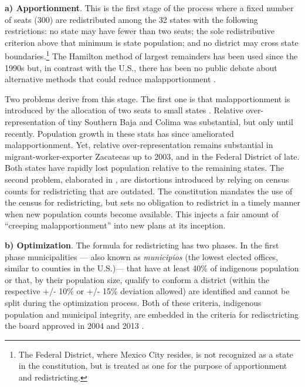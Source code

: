 \documentclass[letter,12pt]{article}
\begin{document}
\textbf{a) Apportionment}. This is the first stage of the process where a fixed number of seats (300) are redistributed among the 32 states with the following restrictions: no state may have fewer than two seats; the sole redistributive criterion above that minimum is state population; and no district may cross state boundaries.\footnote{The Federal District, where Mexico City resides, is not recognized as a state in the constitution, but is treated as one for the purpose of apportionment and redistricting.} The Hamilton method of largest remainders has been used since the 1990s \citep[][:10]{balinskiYoung2001FairRep} but, in contrast with the U.S., there has been no public debate about alternative methods that could reduce malapportionment \citep{szpiro.numbersRule.2010,balinski.rodriguez.1996}. 

Two problems derive from this stage. The first one is that malapportionment is introduced by the allocation of two seats to small states \citep{magar.etalBiasMultiParty2015}. Relative over-representation of tiny Southern Baja and Colima was substantial, but only until recently. Population growth in these stats has since ameliorated malapportionment. Yet, relative over-representation remains substantial in migrant-worker-exporter Zacatecas up to 2003, and in the Federal District of late. Both states have rapidly lost population relative to the remaining states. The second problem, elaborated in \citep{magar.etalBiasMultiParty2015}, are distortions introduced by relying on census counts for redistricting that are outdated. The constitution mandates the use of the census for redistricting, but sets no obligation to redistrict in a timely manner when new population counts become available. This injects a fair amount of ``creeping malapportionment'' into new plans at its inception.

\textbf{b) Optimization}. The formula for redistricting has two phases. In the first phase municipalities --- also known as \emph{municipios} (the lowest elected offices, similar to counties in the U.S.)---  that have at least 40\% of indigenous population or that, by their population size, qualify to conform a district (within the respective +/- 10\% or  +/- 15\% deviation allowed) are identified and cannot be split during the optimization process. Both of these criteria, indigenous population and municipal integrity, are embedded in the criteria for redisctricting the board approved in 2004 and 2013 \citep{acuerdo.ife.2004,acuerdo.ife.2013}. 
\end{document}
